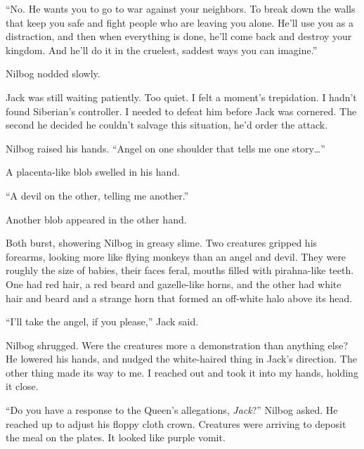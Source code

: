 ``No.  He wants you to go to war against your neighbors.  To break down the walls that keep you safe and fight people who are leaving you alone.  He'll use you as a distraction, and then when everything is done, he'll come back and destroy your kingdom.  And he'll do it in the cruelest, saddest ways you can imagine.''



Nilbog nodded slowly.



Jack was still waiting patiently.  Too quiet.  I felt a moment's trepidation.  I hadn't found Siberian's controller.  I needed to defeat him before Jack was cornered.  The second he decided he couldn't salvage this situation, he'd order the attack.



Nilbog raised his hands.  ``Angel on one shoulder that tells me one story\ldots''



A placenta-like blob swelled in his hand.



``A devil on the other, telling me another.''



Another blob appeared in the other hand.



Both burst, showering Nilbog in greasy slime.  Two creatures gripped his forearms, looking more like flying monkeys than an angel and devil.  They were roughly the size of babies, their faces feral, mouths filled with pirahna-like teeth.  One had red hair, a red beard and gazelle-like horns, and the other had white hair and beard and a strange horn that formed an off-white halo above its head.



``I'll take the angel, if you please,'' Jack said.



Nilbog shrugged.  Were the creatures more a demonstration than anything else?  He lowered his hands, and nudged the white-haired thing in Jack's direction.  The other thing made its way to me.  I reached out and took it into my hands, holding it close.



``Do you have a response to the Queen's allegations, \emph{Jack}?''  Nilbog asked.  He reached up to adjust his floppy cloth crown.  Creatures were arriving to deposit the meal on the plates.  It looked like purple vomit.




